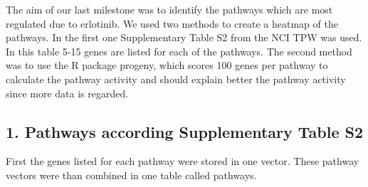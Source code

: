 \documentclass[]{article}
\begin{document}
The aim of our last milestone was to identify the pathways which are
most regulated due to erlotinib. We used two methods to create a heatmap
of the pathways. In the first one Supplementary Table S2 from the NCI
TPW was used. In this table 5-15 genes are listed for each of the
pathways. The second method was to use the R package progeny, which
scores 100 genes per pathway to calculate the pathway activity and
should explain better the pathway activity since more data is regarded.

\hypertarget{pathways-according-supplementary-table-s2}{%
\subsection{1. Pathways according Supplementary Table
S2}\label{pathways-according-supplementary-table-s2}}

First the genes listed for each pathway were stored in one vector. These
pathway vectors were than combined in one table called pathways.
\end{document}
